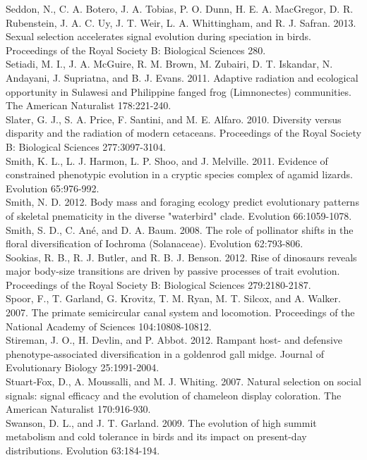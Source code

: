 Seddon, N., C. A. Botero, J. A. Tobias, P. O. Dunn, H. E. A. MacGregor, D. R. Rubenstein, J. A. C. Uy, J. T. Weir, L. A. Whittingham, and R. J. Safran. 2013. Sexual selection accelerates signal evolution during speciation in birds. Proceedings of the Royal Society B: Biological Sciences 280.\\
Setiadi, M. I., J. A. McGuire, R. M. Brown, M. Zubairi, D. T. Iskandar, N. Andayani, J. Supriatna, and B. J. Evans. 2011. Adaptive radiation and ecological opportunity in Sulawesi and Philippine fanged frog (Limnonectes) communities. The American Naturalist 178:221-240.\\
Slater, G. J., S. A. Price, F. Santini, and M. E. Alfaro. 2010. Diversity versus disparity and the radiation of modern cetaceans. Proceedings of the Royal Society B: Biological Sciences 277:3097-3104.\\
Smith, K. L., L. J. Harmon, L. P. Shoo, and J. Melville. 2011. Evidence of constrained phenotypic evolution in a cryptic species complex of agamid lizards. Evolution 65:976-992.\\
Smith, N. D. 2012. Body mass and foraging ecology predict evolutionary patterns of skeletal pnematicity in the diverse "waterbird" clade. Evolution 66:1059-1078.\\
Smith, S. D., C. Ané, and D. A. Baum. 2008. The role of pollinator shifts in the floral diversification of Iochroma (Solanaceae). Evolution 62:793-806.\\
Sookias, R. B., R. J. Butler, and R. B. J. Benson. 2012. Rise of dinosaurs reveals major body-size transitions are driven by passive processes of trait evolution. Proceedings of the Royal Society B: Biological Sciences 279:2180-2187.\\
Spoor, F., T. Garland, G. Krovitz, T. M. Ryan, M. T. Silcox, and A. Walker. 2007. The primate semicircular canal system and locomotion. Proceedings of the National Academy of Sciences 104:10808-10812.\\
Stireman, J. O., H. Devlin, and P. Abbot. 2012. Rampant host- and defensive phenotype-associated diversification in a goldenrod gall midge. Journal of Evolutionary Biology 25:1991-2004.\\
Stuart‐Fox, D., A. Moussalli, and M. J. Whiting. 2007. Natural selection on social signals: signal efficacy and the evolution of chameleon display coloration. The American Naturalist 170:916-930.\\
Swanson, D. L., and J. T. Garland. 2009. The evolution of high summit metabolism and cold tolerance in birds and its impact on present-day distributions. Evolution 63:184-194.\\
